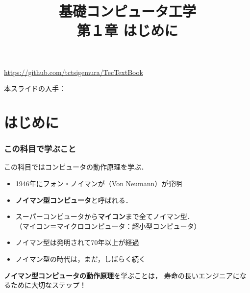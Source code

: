 \documentclass[handout]{beamer}        %
\begin{document}
\title{基礎コンピュータ工学\\第１章 はじめに}
\date{}

\begin{frame}
  \titlepage
  \centerline{\url{https://github.com/tctsigemura/TecTextBook}}
  \vfill
  \centerline{本スライドの入手：
    }
\end{frame}


\section{はじめに}
\begin{frame}
  \frametitle{この科目で学ぶこと}
  この科目ではコンピュータの動作原理を学ぶ．
  \vfill
  \begin{itemize}
  \item 1946年にフォン・ノイマンが（Von Neumann）が発明
  \item {\bf ノイマン型コンピュータ}と呼ばれる．
  \item スーパーコンピュータから{\bf マイコン}まで全てノイマン型．\\
    （マイコン＝マイクロコンピュータ：超小型コンピュータ）
  \item ノイマン型は発明されて70年以上が経過
  \item ノイマン型の時代は，まだ，しばらく続く
  \end{itemize}
  \vfill
  {\bf ノイマン型コンピュータの動作原理}を学ぶことは，
  寿命の長いエンジニアになるために大切なステップ！
\end{frame}
\end{document}
